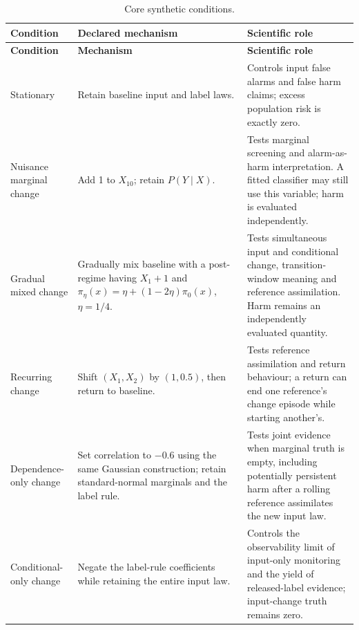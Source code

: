 \documentclass[11pt,a4paper]{article}
\begin{document}
\begin{longtable}{L{3.2cm}L{6.1cm}L{6.1cm}}
\caption{Core synthetic conditions.}\label{tab:conditions}\\
\toprule{}\textbf{Condition}&\textbf{Declared mechanism}&\textbf{Scientific role}\\\midrule\endfirsthead
\toprule{}\textbf{Condition}&\textbf{Mechanism}&\textbf{Scientific role}\\\midrule\endhead
\bottomrule\endlastfoot
Stationary & Retain baseline input and label laws. & Controls input false alarms and false harm claims; excess population risk is exactly zero.\\[3pt]
Nuisance marginal change & Add 1 to $X_{10}$; retain $P(Y\mid X)$. & Tests marginal screening and alarm-as-harm interpretation. A fitted classifier may still use this variable; harm is evaluated independently.\\[3pt]
Gradual mixed change & Gradually mix baseline with a post-regime having $X_1+1$ and $\pi_\eta(x)=\eta+(1-2\eta)\pi_0(x)$, $\eta=1/4$. & Tests simultaneous input and conditional change, transition-window meaning and reference assimilation. Harm remains an independently evaluated quantity.\\[3pt]
Recurring change & Shift $(X_1,X_2)$ by $(1,0.5)$, then return to baseline. & Tests reference assimilation and return behaviour; a return can end one reference's change episode while starting another's.\\[3pt]
Dependence-only change & Set correlation to $-0.6$ using the same Gaussian construction; retain standard-normal marginals and the label rule. & Tests joint evidence when marginal truth is empty, including potentially persistent harm after a rolling reference assimilates the new input law.\\[3pt]
Conditional-only change & Negate the label-rule coefficients while retaining the entire input law. & Controls the observability limit of input-only monitoring and the yield of released-label evidence; input-change truth remains zero.\\
\end{longtable}
\end{document}
